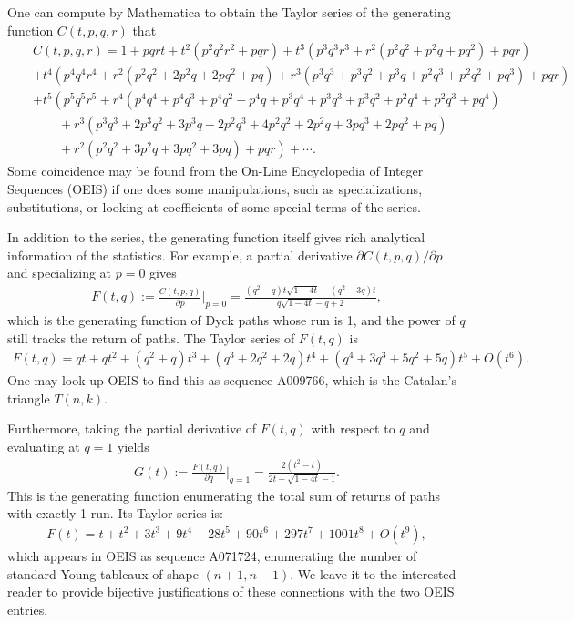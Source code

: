 \documentclass[11pt,a4paper,reqno]{article}
\begin{document}
{    One can compute by Mathematica to obtain the Taylor series of the generating function $C(t,p,q,r)$ that
    \begin{eqnarray*}
        &&C(t,p,q,r)=1+p q r t+t^2 \left(p^2 q^2 r^2+p q r\right)
        +t^3 \left(p^3 q^3 r^3+r^2
        \left(p^2 q^2+p^2 q+p q^2\right)+p q r\right)
        \\&&+t^4
        \left(p^4 q^4 r^4+r^2 \left(p^2 q^2+2 p^2 q+2 p q^2+p
        q\right)+r^3 \left(p^3 q^3+p^3 q^2+p^3 q+p^2 q^3+p^2
        q^2+p q^3\right)+p q r\right)
        \\&&+t^5 \left(p^5 q^5 r^5
        +r^4 \left(p^4 q^4+p^4 q^3+p^4
        q^2+p^4 q+p^3 q^4+p^3 q^3+p^3 q^2+p^2 q^4+p^2 q^3+p
        q^4\right)
        \right.
        \\&&\left.\qquad +r^3 \left(p^3
        q^3+2 p^3 q^2+3 p^3 q+2 p^2 q^3+4 p^2 q^2+2 p^2 q+3 p
        q^3+2 p q^2+p q\right)\right.
        \\&&\left.\qquad +r^2
        \left(p^2 q^2+3 p^2 q+3 p q^2+3 p q\right) +p q r\right)+\cdots.
    \end{eqnarray*}
Some coincidence may be found from the On-Line Encyclopedia of Integer Sequences (OEIS) \cite{OEIS} if one does some manipulations, such as specializations, substitutions, or looking at coefficients of some special terms of the series. 
    
In addition to the series, the generating function itself gives rich analytical information of the statistics. For example, 
a partial derivative $\partial C(t,p,q) /\partial p$ and specializing at $p=0$ gives
\begin{eqnarray*}
F(t,q):=\frac{C(t,p,q)}{\partial p}\bigg|_{p=0} = \frac{(q^2 - q)t\sqrt{1 - 4t} - (q^2 - 3q)t}{q\sqrt{1 - 4t} - q + 2},
\end{eqnarray*}
which is the generating function of Dyck paths whose run is 1, and the power of $q$ still tracks the return of paths.
The Taylor series of $F(t,q)$ is
\begin{eqnarray*}
F(t,q) = qt + qt^2 + (q^2+q)t^3 + (q^3+2q^2+2q)t^4 + (q^4+3q^3+5q^2+5q)t^5 + O(t^6). 
\end{eqnarray*}
One may look up OEIS \cite{OEIS} to find this as sequence A009766, which is the Catalan's triangle $T(n,k)$.


Furthermore, taking the partial derivative of $F(t,q)$ with respect to $q$ and evaluating at $q=1$ yields 
\begin{eqnarray*}
G(t) :=\frac{F(t,q)}{\partial q}\bigg|_{q=1}  = \frac{2(t^2 - t)}{2t - \sqrt{1 - 4t} - 1}.
\end{eqnarray*}
This is the generating function enumerating the total sum of returns of paths with exactly 1 run. Its Taylor series is:
\begin{eqnarray*}
F(t) = t + t^2 + 3t^3 + 9t^4 + 28t^5 + 90t^6 + 297 t^7 + 1001 t^8 + O(t^9),
\end{eqnarray*}
which appears in OEIS \cite{OEIS} as sequence A071724, enumerating the number of standard Young tableaux of shape $(n+1,n-1)$. We leave it to the interested reader to provide bijective justifications of these connections with the two OEIS entries.

}
\end{document}
